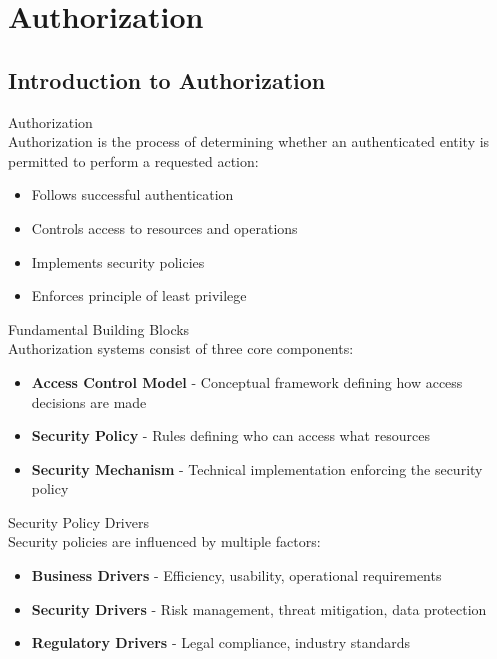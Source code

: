 \section{Authorization}

\subsection{Introduction to Authorization}

\begin{definition}{Authorization}\\
Authorization is the process of determining whether an authenticated entity is permitted to perform a requested action:
\begin{itemize}
    \item Follows successful authentication
    \item Controls access to resources and operations
    \item Implements security policies
    \item Enforces principle of least privilege
\end{itemize}
\end{definition}

\begin{concept}{Fundamental Building Blocks}\\
Authorization systems consist of three core components:
\begin{itemize}
    \item \textbf{Access Control Model} - Conceptual framework defining how access decisions are made
    \item \textbf{Security Policy} - Rules defining who can access what resources
    \item \textbf{Security Mechanism} - Technical implementation enforcing the security policy
\end{itemize}
\end{concept}

\begin{theorem}{Security Policy Drivers}\\
Security policies are influenced by multiple factors:
\begin{itemize}
    \item \textbf{Business Drivers} - Efficiency, usability, operational requirements
    \item \textbf{Security Drivers} - Risk management, threat mitigation, data protection
    \item \textbf{Regulatory Drivers} - Legal compliance, industry standards
\end{itemize}
\end{theorem}

